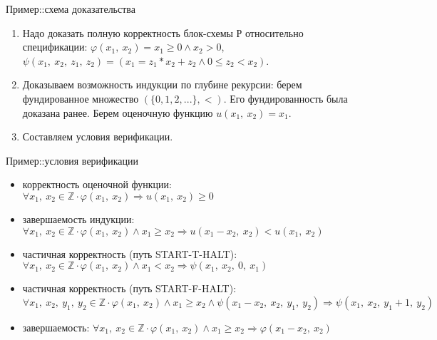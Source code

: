 \documentclass[hyperref={unicode=true}]{beamer}
\begin{document}
    \begin{frame}{Пример::схема доказательства}
    \begin{enumerate}
    \item
    Надо доказать полную корректность блок-схемы Р относительно
    спецификации: $\varphi(x_1,~x_2) = x_1 \geq 0 \land x_2 > 0$,
    $\psi(x_1,~x_2,~z_1,~z_2) = (x_1 = z_1 * x_2 + z_2 \land 0 \leq z_2 < x_2)$.

    \item
    Доказываем возможность индукции по глубине рекурсии:
    берем фундированное множество $(\{0, 1, 2, ...\}, <)$. Его фундированность
    была доказана ранее. Берем оценочную функцию $u(x_1,~x_2) = x_1$.

    \item
    Составляем условия верификации.
    \end{enumerate}
    \end{frame}

    \begin{frame}{Пример::условия верификации}
    \begin{itemize}
    \item корректность оценочной функции:
            $\forall x_1,~x_2 \in \mathbb{Z} \cdot
            \varphi(x_1,~x_2)
            \Rightarrow
            u(x_1,~x_2) \geq 0$
    \item завершаемость индукции:
            $\forall x_1,~x_2 \in \mathbb{Z} \cdot
            \varphi(x_1,~x_2) \land x_1 \geq x_2
            \Rightarrow
            u(x_1 - x_2,~x_2) < u(x_1,~x_2)$
    \item частичная корректность (путь START-T-HALT):
            $\forall x_1,~x_2 \in \mathbb{Z} \cdot
            \varphi(x_1,~x_2) \land x_1 < x_2
            \Rightarrow
            \psi(x_1,~x_2,~0,~x_1)$
    \item частичная корректность (путь START-F-HALT):
            $\forall x_1,~x_2,~y_1,~y_2 \in \mathbb{Z} \cdot
            \varphi(x_1,~x_2) \land x_1 \geq x_2 \land
            \psi(x_1 - x_2,~x_2,~y_1,~y_2)
            \Rightarrow
            \psi(x_1,~x_2,~y_1 + 1,~y_2)$
    \item завершаемость:
            $\forall x_1,~x_2 \in \mathbb{Z} \cdot
            \varphi(x_1,~x_2) \land x_1 \geq x_2
            \Rightarrow
            \varphi(x_1 - x_2,~x_2)$
    \end{itemize}
    \end{frame}
\end{document}
